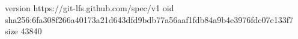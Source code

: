 version https://git-lfs.github.com/spec/v1
oid sha256:6fa308f266a40173a21d643dfd9bdb77a56aaf1fdb84a9b4e3976fdc07e133f7
size 43840
